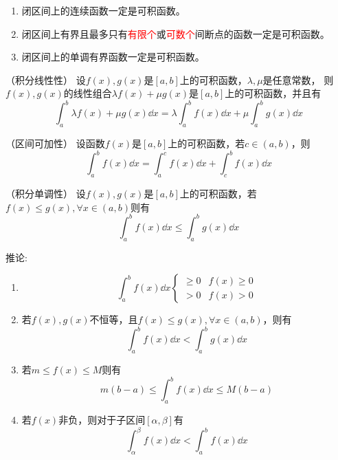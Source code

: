 \begin{theorem}
    \begin{enumerate}
        \item 闭区间上的连续函数一定是可积函数。
        \item 闭区间上有界且最多只有\textcolor{red}{有限个}或\textcolor{red}{可数个}间断点的函数一定是可积函数。
        \item 闭区间上的单调有界函数一定是可积函数。
    \end{enumerate}
\end{theorem}

\begin{theorem}
    （积分线性性）
    设$f(x),g(x)$是$[a,b]$上的可积函数，$\lambda,\mu$是任意常数，
    则$f(x),g(x)$的线性组合$\lambda f(x)+\mu g(x)$是$[a,b]$上的可积函数，并且有
    \[
        \int_a^b \lambda f(x)+\mu g(x)\dd{x}
        =
        \lambda\int_a^b f(x)\dd{x} + \mu\int_a^b g(x)\dd{x}
    \]
\end{theorem}

\begin{theorem}
    （区间可加性）
    设函数$f(x)$是$[a,b]$上的可积函数，若$c\in(a,b)$，则
    \[ \int_a^b f(x)\dd{x} = \int_a^c f(x)\dd{x} + \int_c^b f(x)\dd{x} \]
\end{theorem}

\begin{theorem}
    （积分单调性）
    设$f(x),g(x)$是$[a,b]$上的可积函数，若$f(x)\leq g(x), \forall x \in (a,b)$则有
    \[ \int_a^b f(x)\dd{x} \leq \int_a^b g(x)\dd{x} \]

    推论:
    \begin{enumerate}[(1)]
        \item \[
                  \int_a^b f(x)\dd{x}
                  \begin{cases}
                      \geq 0 & f(x)\geq 0 \\
                      > 0    & f(x) > 0
                  \end{cases}
              \]
        \item 若$f(x),g(x)$不恒等，且$f(x)\leq g(x),\forall x \in (a,b)$，则有
              \[ \int_a^b f(x)\dd{x} < \int_a^b g(x)\dd{x} \]
        \item 若$m \leq f(x) \leq M$则有
              \[ m(b-a) \leq \int_a^b f(x)\dd{x} \leq M(b-a) \]
        \item 若$f(x)$非负，则对于子区间$[\alpha,\beta]$有
              \[ \int_\alpha^\beta f(x)\dd{x} < \int_a^bf(x)\dd{x} \]
    \end{enumerate}
\end{theorem}

